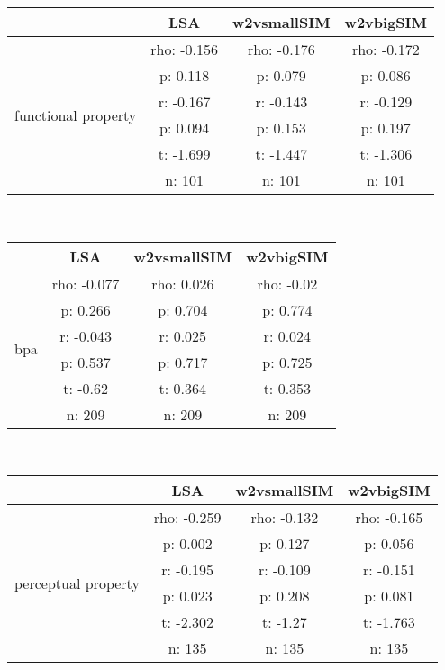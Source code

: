 \documentclass{article}
\begin{document}
\begin{tabular}{cccc|}\cline{2-4}
&\multicolumn{1}{|c}{LSA} & w2vsmallSIM & w2vbigSIM \\\hline
\multicolumn{1}{|c|}{\multirow{6}{*}{functional property}} & rho: -0.156 & rho: -0.176 & rho: -0.172 \\
\multicolumn{1}{|c|}{} & p: 0.118 & p: 0.079 & p: 0.086 \\
\multicolumn{1}{|c|}{} & r: -0.167 & r: -0.143 & r: -0.129 \\
\multicolumn{1}{|c|}{} & p: 0.094 & p: 0.153 & p: 0.197 \\
\multicolumn{1}{|c|}{} & t: -1.699 & t: -1.447 & t: -1.306 \\
\multicolumn{1}{|c|}{} & n: 101 & n: 101 & n: 101 \\
\hline
\end{tabular}\\
\begin{tabular}{cccc|}\cline{2-4}
&\multicolumn{1}{|c}{LSA} & w2vsmallSIM & w2vbigSIM \\\hline
\multicolumn{1}{|c|}{\multirow{6}{*}{bpa}} & rho: -0.077 & rho: 0.026 & rho: -0.02 \\
\multicolumn{1}{|c|}{} & p: 0.266 & p: 0.704 & p: 0.774 \\
\multicolumn{1}{|c|}{} & r: -0.043 & r: 0.025 & r: 0.024 \\
\multicolumn{1}{|c|}{} & p: 0.537 & p: 0.717 & p: 0.725 \\
\multicolumn{1}{|c|}{} & t: -0.62 & t: 0.364 & t: 0.353 \\
\multicolumn{1}{|c|}{} & n: 209 & n: 209 & n: 209 \\
\hline
\end{tabular}\\
\begin{tabular}{cccc|}\cline{2-4}
&\multicolumn{1}{|c}{LSA} & w2vsmallSIM & w2vbigSIM \\\hline
\multicolumn{1}{|c|}{\multirow{6}{*}{perceptual property}} & rho: -0.259 & rho: -0.132 & rho: -0.165 \\
\multicolumn{1}{|c|}{} & p: 0.002 & p: 0.127 & p: 0.056 \\
\multicolumn{1}{|c|}{} & r: -0.195 & r: -0.109 & r: -0.151 \\
\multicolumn{1}{|c|}{} & p: 0.023 & p: 0.208 & p: 0.081 \\
\multicolumn{1}{|c|}{} & t: -2.302 & t: -1.27 & t: -1.763 \\
\multicolumn{1}{|c|}{} & n: 135 & n: 135 & n: 135 \\
\hline
\end{tabular}\\
\end{document}
